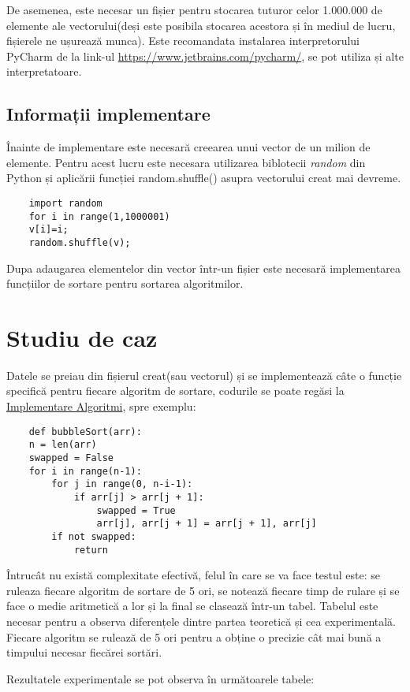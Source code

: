 \documentclass[12pt]{article}
\begin{document}
De asemenea, este necesar un fișier pentru stocarea tuturor celor 1.000.000 de elemente ale vectorului(deși este posibila stocarea acestora și în mediul de lucru, fișierele ne ușurează munca).
Este recomandata instalarea interpretorului PyCharm de la link-ul \url{https://www.jetbrains.com/pycharm/}, se pot utiliza și alte interpretatoare.
\subsection{Informații implementare}
\label{dific}
Înainte de implementare este necesară creearea unui vector de un milion de elemente. Pentru acest lucru este necesara utilizarea biblotecii \emph{random} din Python și aplicării funcției random.shuffle() asupra vectorului creat mai devreme.
\begin{lstlisting}
    import random
    for i in range(1,1000001)
    v[i]=i;
    random.shuffle(v);
\end{lstlisting}
Dupa adaugarea elementelor din vector într-un fișier este necesară implementarea funcțiilor de sortare pentru sortarea algoritmilor.


\section{Studiu de caz}
\label{sec:studiudecaz}
Datele se preiau din fișierul creat(sau vectorul) și se implementează câte o funcție specifică pentru fiecare algoritm de sortare, codurile se poate regăsi la \href{https://github.com/stefearares}{Implementare Algoritmi}, spre exemplu:
\pagebreak
\begin{lstlisting}
    def bubbleSort(arr):
    n = len(arr)
    swapped = False
    for i in range(n-1):
        for j in range(0, n-i-1):
            if arr[j] > arr[j + 1]:
                swapped = True
                arr[j], arr[j + 1] = arr[j + 1], arr[j]         
        if not swapped:
            return
\end{lstlisting}
Întrucât nu există complexitate efectivă, felul în care se va face testul este: se ruleaza fiecare algoritm de sortare de 5 ori, se notează fiecare timp de rulare și se face o medie aritmetică a lor și la final se clasează într-un tabel.
Tabelul este necesar pentru a observa diferențele dintre partea teoretică și cea experimentală.
Fiecare algoritm se rulează de 5 ori pentru a obține o precizie cât mai bună a timpului necesar fiecărei sortări.

Rezultatele experimentale se pot observa în următoarele tabele:
\end{document}
